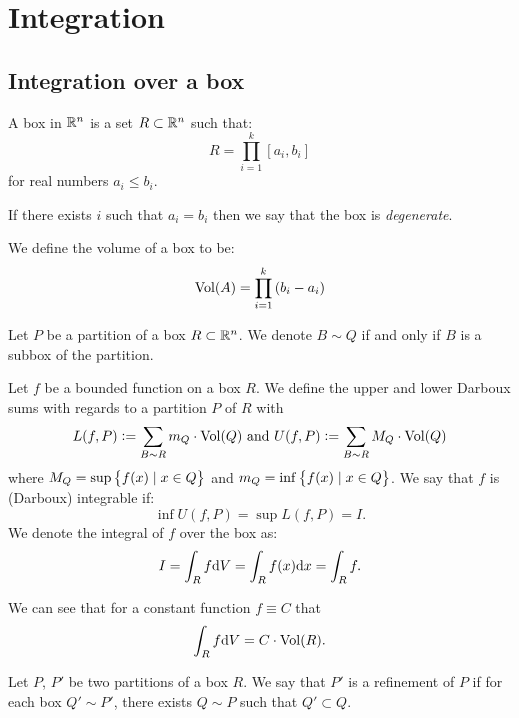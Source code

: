 \documentclass[11pt,a4paper]{article}
\begin{document}
\newpage

\section{Integration}
\subsection{Integration over a box}
\begin{definition}[Box]
  A box in $\mathbb{R}^n$ is a set $R \subset \mathbb{R}^n$ such that:
  \[
    R = \prod_{i=1}^{k}{[a_i,b_i]}
  \]
  for real numbers $a_i \le b_i$.
\end{definition}
\begin{remark}
  If there exists $i$ such that $a_i = b_i$
  then we say that the box is \textit{degenerate}.
\end{remark}
\begin{definition}
  We define the volume of a box to be:
  \[
    \operatorname{Vol}(A) = \prod_{i=1}^{k}{(b_i-a_i)}
  \]
\end{definition}


\begin{remark}
  Let $P$ be a partition of a box $R \subset \mathbb{R}^n$.
  We denote $B \sim Q$ if and only if $B$ is a subbox of the partition.
\end{remark}

\begin{definition}
  Let $f$ be a bounded function on a box $R$.
  We define the upper and lower Darboux sums with
  regards to a partition $P$ of $R$ with
  \[
    L(f,P) := \sum_{B \sim R} m_Q \cdot \operatorname{Vol}(Q) \text{ and }
    U(f,P) := \sum_{B \sim R} M_Q \cdot \operatorname{Vol}(Q)
  \]
  where $M_Q = \sup\left\{f(x) \mid x \in Q\right\}$ and
  $m_Q = \inf\left\{f(x) \mid x \in Q\right\}$.
  We say that $f$ is (Darboux) integrable if:
  \[
    \inf U(f,P) = \sup L(f,P) = I.
  \]
  We denote the integral of $f$ over the box as:
  \[
    I =
    \int_{R} f \dV = 
    \int_{R} f(x) \dx =
    \int_{R} f.
  \]
\end{definition}

\begin{remark}
  We can see that for a constant function $f \equiv C$ that
  \[
    \int_{R} f \mathrm{d} V = C \cdot \operatorname{Vol}(R).
  \]
\end{remark}

\begin{definition}[Refinement]
  Let $P$, $P'$ be two partitions of a box $R$.
  We say that $P'$ is a refinement of $P$ if for each box
  $Q' \sim P'$, there exists $Q \sim P$ such that $Q' \subset Q$.
\end{definition}
\end{document}
